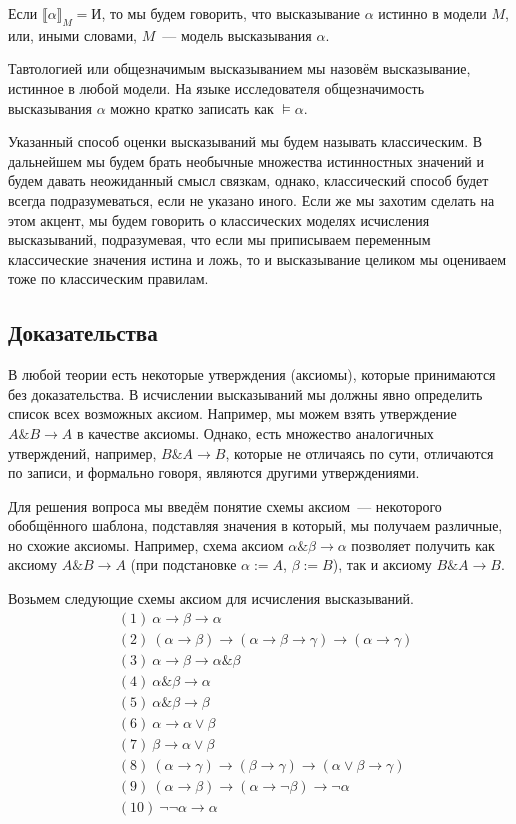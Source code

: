 \documentclass[a4paper,11pt]{article}
\theoremstyle{definition}
\newcommand{\sem}[2]{\llbracket #1 \rrbracket_{#2}}
\newcommand{\True}{\text{И}}
\begin{document}
Если $\sem{\alpha}{M} = \True$, то мы будем говорить, что высказывание $\alpha$
истинно в модели $M$, или, иными словами, $M$~--- модель высказывания $\alpha$.

Тавтологией или общезначимым высказыванием мы назовём высказывание, истинное в
любой модели. На языке исследователя общезначимость высказывания $\alpha$ можно
кратко записать как $\models \alpha$.

Указанный способ оценки высказываний мы будем называть классическим. В
дальнейшем мы будем брать необычные множества истинностных значений и будем
давать неожиданный смысл связкам, однако, классический способ будет всегда
подразумеваться, если не указано иного. Если же мы захотим сделать на этом
акцент, мы будем говорить о классических моделях исчисления высказываний,
подразумевая, что если мы приписываем переменным классические значения истина и
ложь, то и высказывание целиком мы оцениваем тоже по классическим правилам.

\subsection{Доказательства}
В любой теории есть некоторые утверждения (аксиомы), которые принимаются без
доказательства. В исчислении высказываний мы должны явно определить список всех
возможных аксиом. Например, мы можем взять утверждение $A\mathbin{\&}B \to A$ в
качестве аксиомы. Однако, есть множество аналогичных утверждений, например,
$B\mathbin{\&}A \to B$, которые не отличаясь по сути, отличаются по записи, и
формально говоря, являются другими утверждениями.

Для решения вопроса мы введём понятие схемы аксиом~--- некоторого обобщённого
шаблона, подставляя значения в который, мы получаем различные, но схожие
аксиомы. Например, схема аксиом $\alpha\mathbin{\&}\beta \to \alpha$ позволяет
получить как аксиому $A\mathbin{\&}B \to A$ (при подстановке $\alpha := A$,
$\beta := B$), так и аксиому $B\mathbin{\&}A \to B$.

Возьмем следующие схемы аксиом для исчисления высказываний.
\begin{align*}
&(1)\ \alpha \to \beta \to \alpha\\
&(2)\ (\alpha \to \beta) \to (\alpha \to \beta \to \gamma) \to (\alpha \to \gamma)\\
&(3)\ \alpha \to \beta \to \alpha\mathbin{\&}\beta\\
&(4)\ \alpha\mathbin{\&}\beta \to \alpha\\
&(5)\ \alpha\mathbin{\&}\beta \to \beta\\
&(6)\ \alpha \to \alpha \vee \beta\\
&(7)\ \beta \to \alpha \vee \beta\\
&(8)\ (\alpha \to \gamma) \to (\beta \to \gamma) \to (\alpha \vee \beta \to \gamma)\\
&(9)\ (\alpha \to \beta) \to (\alpha \to \neg\beta) \to \neg\alpha\\
&(10)\ \neg\neg\alpha \to \alpha
\end{align*}
\end{document}
